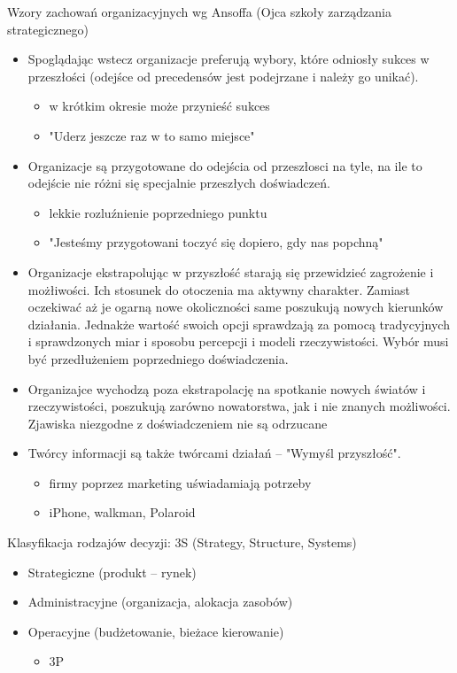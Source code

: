 \documentclass[a4paper,10pt]{report}
\begin{document}
\noindent Wzory zachowań organizacyjnych wg Ansoffa (Ojca szkoły zarządzania strategicznego)
\begin{itemize}
	\item Spoglądając wstecz organizacje preferują wybory, które odniosły sukces w przeszłości (odejśce od precedensów jest podejrzane i należy go unikać).
	\begin{itemize}
		\item w krótkim okresie może przynieść sukces
		\item "Uderz jeszcze raz w to samo miejsce"
	\end{itemize}
	\item Organizacje są przygotowane do odejścia od przeszłosci na tyle, na ile to odejście nie różni się specjalnie przeszłych doświadczeń.
	\begin{itemize}
		\item lekkie rozluźnienie poprzedniego punktu
		\item "Jesteśmy przygotowani toczyć się dopiero, gdy nas popchną"
	\end{itemize}
	\item Organizacje ekstrapolując w przyszłość starają się przewidzieć zagrożenie i możłiwości. Ich stosunek do otoczenia ma aktywny charakter. Zamiast oczekiwać aż je ogarną nowe okoliczności same poszukują nowych kierunków działania. Jednakże wartość swoich opcji sprawdzają za pomocą tradycyjnych i sprawdzonych miar i sposobu percepcji i modeli rzeczywistości. Wybór musi być przedłużeniem poprzedniego doświadczenia.
	\item Organizajce wychodzą poza ekstrapolację na spotkanie nowych światów i rzeczywistości, poszukują zarówno nowatorstwa, jak i nie znanych możliwości. Zjawiska niezgodne z doświadczeniem nie są odrzucane
	\item Twórcy informacji są także twórcami działań -- "Wymyśl przyszłość".
	\begin{itemize}
		\item firmy poprzez marketing uświadamiają potrzeby
		\item iPhone, walkman, Polaroid
	\end{itemize}
\end{itemize}


\noindent Klasyfikacja rodzajów decyzji: 3S (Strategy, Structure, Systems)
\begin{itemize}
	\item Strategiczne (produkt -- rynek)
	\item Administracyjne (organizacja, alokacja zasobów)
	\item Operacyjne (budżetowanie, bieżace kierowanie)
	\begin{itemize}
		\item 3P
	\end{itemize}
\end{itemize}
\end{document}
